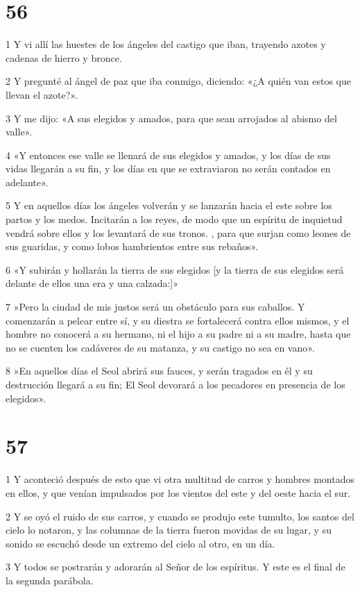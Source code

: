 \chapter{56}

\par 1 Y vi allí las huestes de los ángeles del castigo que iban, trayendo azotes y cadenas de hierro y bronce.
\par 2 Y pregunté al ángel de paz que iba conmigo, diciendo: «¿A quién van estos que llevan el azote?».
\par 3 Y me dijo: «A sus elegidos y amados, para que sean arrojados al abismo del valle».
\par 4 «Y entonces ese valle se llenará de sus elegidos y amados, y los días de sus vidas llegarán a su fin, y los días en que se extraviaron no serán contados en adelante».
\par 5 Y en aquellos días los ángeles volverán y se lanzarán hacia el este sobre los partos y los medos. Incitarán a los reyes, de modo que un espíritu de inquietud vendrá sobre ellos y los levantará de sus tronos. , para que surjan como leones de sus guaridas, y como lobos hambrientos entre sus rebaños».
\par 6 «Y subirán y hollarán la tierra de sus elegidos [y la tierra de sus elegidos será delante de ellos una era y una calzada:]»
\par 7 »Pero la ciudad de mis justos será un obstáculo para sus caballos. Y comenzarán a pelear entre sí, y su diestra se fortalecerá contra ellos mismos, y el hombre no conocerá a su hermano, ni el hijo a su padre ni a su madre, hasta que no se cuenten los cadáveres de su matanza, y su castigo no sea en vano».
\par 8 »En aquellos días el Seol abrirá sus fauces, y serán tragados en él y su destrucción llegará a su fin; El Seol devorará a los pecadores en presencia de los elegidos».

\chapter{57}

\par 1 Y aconteció después de esto que vi otra multitud de carros y hombres montados en ellos, y que venían impulsados ​​por los vientos del este y del oeste hacia el sur.
\par 2 Y se oyó el ruido de sus carros, y cuando se produjo este tumulto, los santos del cielo lo notaron, y las columnas de la tierra fueron movidas de su lugar, y su sonido se escuchó desde un extremo del cielo al otro, en un día.
\par 3 Y todos se postrarán y adorarán al Señor de los espíritus. Y este es el final de la segunda parábola.

